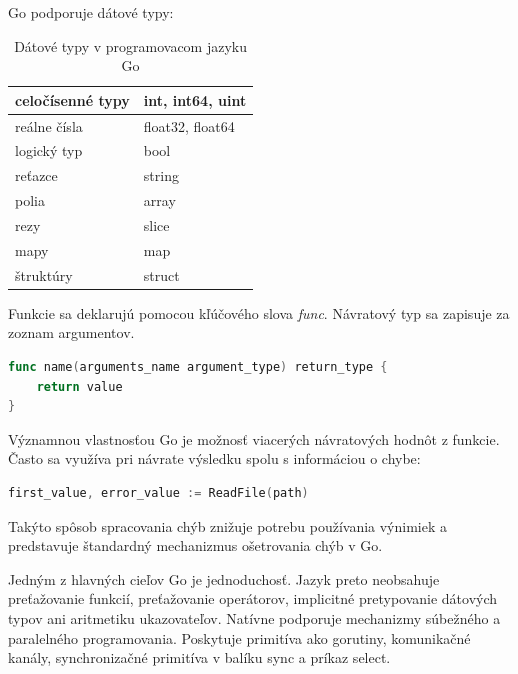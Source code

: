 \documentclass[
  biblatex,
  seconds=true,
  language=slovak,
  figures=false,
  urldate=iso,
  glossaries,
  index
]{kidiplom}
\begin{document}
Go podporuje dátové typy:
\begin{table}[H]
\centering
\caption{Dátové typy v programovacom jazyku Go}
\begin{tabular}{|l|p{8cm}|}
	\hline
	celočísenné  typy & int, int64, uint\\
	\hline
	reálne čísla & float32, float64\\
	\hline
	logický typ & bool\\ 
	\hline
	reťazce & string\\
	\hline
	polia & array\\
	\hline
	rezy & slice\\
	\hline
	mapy & map\\
	\hline
	štruktúry & struct\\
	\hline
\end{tabular}
\end{table}

Funkcie sa deklarujú pomocou kľúčového slova \emph{func}. Návratový typ sa zapisuje za zoznam argumentov. \cite{baugh2010go}
\begin{lstlisting}[language=Go]
func name(arguments_name argument_type) return_type {
	return value
}
\end{lstlisting}
Významnou vlastnosťou Go je možnosť viacerých návratových hodnôt z funkcie. Často sa využíva pri návrate 
výsledku spolu s informáciou o chybe:
\begin{lstlisting}[language=Go]
	first_value, error_value := ReadFile(path)
\end{lstlisting}
Takýto spôsob spracovania chýb znižuje potrebu používania výnimiek a predstavuje štandardný mechanizmus ošetrovania chýb v Go. 
\cite{baugh2010go}

Jedným z hlavných cieľov Go je jednoduchosť. Jazyk preto neobsahuje preťažovanie funkcií, preťažovanie
operátorov, implicitné pretypovanie dátových typov ani aritmetiku ukazovateľov. Natívne podporuje
mechanizmy súbežného a paralelného programovania. Poskytuje primitíva ako gorutiny, 
komunikačné kanály, synchronizačné primitíva v balíku sync a príkaz select. \cite{Beckingsale2015}
\end{document}

